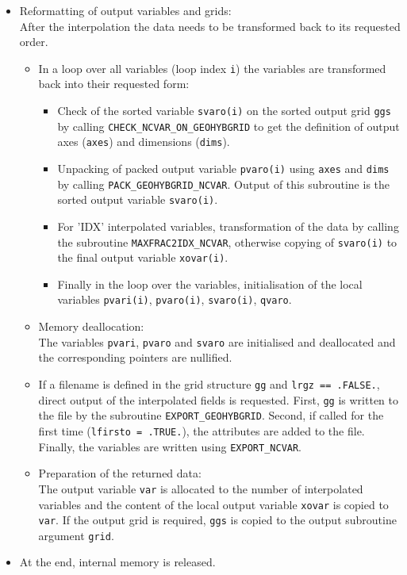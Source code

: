 \documentclass[11pt,twoside]{article}
\begin{document}
\begin{itemize}
\item Reformatting of output variables and grids:\\
After the interpolation the data needs to be transformed back to its
requested order.
\begin{itemize} %
\item In a loop over all variables (loop index \verb|i|)
 the variables are transformed back into their requested form:
\begin{itemize} %
\item Check of the sorted variable \verb|svaro(i)| on the sorted output
 grid \verb|ggs| by calling \verb|CHECK_NCVAR_ON_GEOHYBGRID| to get the
 definition of output axes (\verb|axes|) and dimensions (\verb|dims|).
\item Unpacking of packed output variable \verb|pvaro(i)| using  \verb|axes|
 and \verb|dims| by calling \verb|PACK_GEOHYBGRID_NCVAR|. Output of
 this subroutine is the sorted output variable \verb|svaro(i)|.
\item For 'IDX' interpolated variables, transformation of the data 
 by calling the subroutine \verb|MAXFRAC2IDX_NCVAR|,
 otherwise copying of \verb|svaro(i)| to the final output
 variable \verb|xovar(i)|.
\item Finally in the loop over the variables, initialisation of the local
 variables \verb|pvari(i)|, \verb|pvaro(i)|, \verb|svaro(i)|, \verb|qvaro|.
\end{itemize} %
\item Memory deallocation:\\
 The variables \verb|pvari|, \verb|pvaro| and \verb|svaro| are
 initialised and deallocated and the corresponding pointers are
 nullified.
\item If a filename is defined in the grid structure \verb|gg|
 and \verb|lrgz == .FALSE.|, direct
output of the interpolated fields is requested. First, \verb|gg| is
written to the file by the
subroutine \verb|EXPORT_GEOHYBGRID|. Second, if called for the first
time (\verb|lfirsto = .TRUE.|), the attributes are added to the
file. Finally, the variables are written using \verb|EXPORT_NCVAR|. 
\item Preparation of the returned data: \\
The output variable \verb|var|
is allocated to the number of interpolated variables and the
content of the local output variable \verb|xovar| is copied
to \verb|var|.
If the output grid is required, \verb|ggs| is copied to the output
subroutine argument \verb|grid|.
\end{itemize} %
\item At the end, internal memory is released.
\end{itemize}  %
\end{document}
